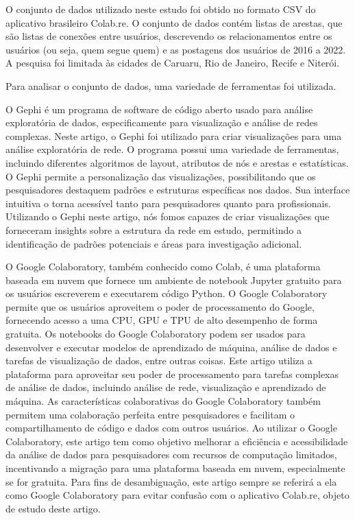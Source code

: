 O conjunto de dados utilizado neste estudo foi obtido no formato CSV do aplicativo brasileiro Colab.re. O conjunto de dados contém listas de arestas, que são listas de conexões entre usuários, descrevendo os relacionamentos entre os usuários (ou seja, quem segue quem) e as postagens dos usuários de 2016 a 2022. A pesquisa foi limitada às cidades de Caruaru, Rio de Janeiro, Recife e Niterói.

Para analisar o conjunto de dados, uma variedade de ferramentas foi utilizada.

O Gephi é um programa de software de código aberto usado para análise exploratória de dados, especificamente para visualização e análise de redes complexas. Neste artigo, o Gephi foi utilizado para criar visualizações para uma análise exploratória de rede. O programa possui uma variedade de ferramentas, incluindo diferentes algoritmos de layout, atributos de nós e arestas e estatísticas. O Gephi permite a personalização das visualizações, possibilitando que os pesquisadores destaquem padrões e estruturas específicas nos dados. Sua interface intuitiva o torna acessível tanto para pesquisadores quanto para profissionais. Utilizando o Gephi neste artigo, nós fomos capazes de criar visualizações que forneceram insights sobre a estrutura da rede em estudo, permitindo a identificação de padrões potenciais e áreas para investigação adicional.

O Google Colaboratory, também conhecido como Colab, é uma plataforma baseada em nuvem que fornece um ambiente de notebook Jupyter gratuito para os usuários escreverem e executarem código Python. O Google Colaboratory permite que os usuários aproveitem o poder de processamento do Google, fornecendo acesso a uma CPU, GPU e TPU de alto desempenho de forma gratuita. Os notebooks do Google Colaboratory podem ser usados para desenvolver e executar modelos de aprendizado de máquina, análise de dados e tarefas de visualização de dados, entre outras coisas. Este artigo utiliza a plataforma para aproveitar seu poder de processamento para tarefas complexas de análise de dados, incluindo análise de rede, visualização e aprendizado de máquina. As características colaborativas do Google Colaboratory também permitem uma colaboração perfeita entre pesquisadores e facilitam o compartilhamento de código e dados com outros usuários. Ao utilizar o Google Colaboratory, este artigo tem como objetivo melhorar a eficiência e acessibilidade da análise de dados para pesquisadores com recursos de computação limitados, incentivando a migração para uma plataforma baseada em nuvem, especialmente se for gratuita. Para fins de desambiguação, este artigo sempre se referirá a ela como Google Colaboratory para evitar confusão com o aplicativo Colab.re, objeto de estudo deste artigo.

